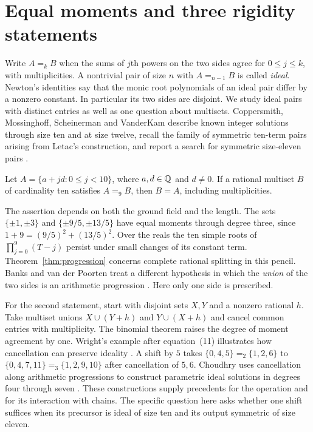 \section{Equal moments and three rigidity statements}
Write \(A=_k B\) when the sums of \(j\)th powers on the two sides agree for \(0\le j\le k\), with multiplicities. A nontrivial pair of size \(n\) with \(A=_{n-1}B\) is called \emph{ideal}. Newton's identities say that the monic root polynomials of an ideal pair differ by a nonzero constant. In particular its two sides are disjoint. We study ideal pairs with distinct entries as well as one question about multisets. Coppersmith, Mossinghoff, Scheinerman and VanderKam describe known integer solutions through size ten and at size twelve, recall the family of symmetric ten-term pairs arising from Letac's construction, and report a search for symmetric size-eleven pairs \cite[\S\S1,4.1]{cmsv}.

\begin{theorem}\label{thm:progression}
Let \(A=\{a+jd:0\le j<10\}\), where \(a,d\in\mathbb Q\) and \(d\ne0\). If a rational multiset \(B\) of cardinality ten satisfies \(A=_9B\), then \(B=A\), including multiplicities.
\end{theorem}
The assertion depends on both the ground field and the length. The sets \(\{\pm1,\pm3\}\) and \(\{\pm9/5,\pm13/5\}\) have equal moments through degree three, since \(1+9=(9/5)^2+(13/5)^2\). Over the reals the ten simple roots of \(\prod_{j=0}^9(T-j)\) persist under small changes of its constant term. Theorem~\ref{thm:progression} concerns complete rational splitting in this pencil. Banks and van der Poorten treat a different hypothesis in which the \emph{union} of the two sides is an arithmetic progression \cite[\S3]{banks}. Here only one side is prescribed.

For the second statement, start with disjoint sets \(X,Y\) and a nonzero rational \(h\). Take multiset unions \(X\cup(Y+h)\) and \(Y\cup(X+h)\) and cancel common entries with multiplicity. The binomial theorem raises the degree of moment agreement by one. Wright's example after equation~(11) illustrates how cancellation can preserve ideality \cite{wright}. A shift by \(5\) takes \(\{0,4,5\}=_2\{1,2,6\}\) to \(\{0,4,7,11\}=_3\{1,2,9,10\}\) after cancellation of \(5,6\). Choudhry uses cancellation along arithmetic progressions to construct parametric ideal solutions in degrees four through seven \cite[\S\S2--6]{choudhry}. These constructions supply precedents for the operation and for its interaction with chains. The specific question here asks whether one shift suffices when its precursor is ideal of size ten and its output symmetric of size eleven.

